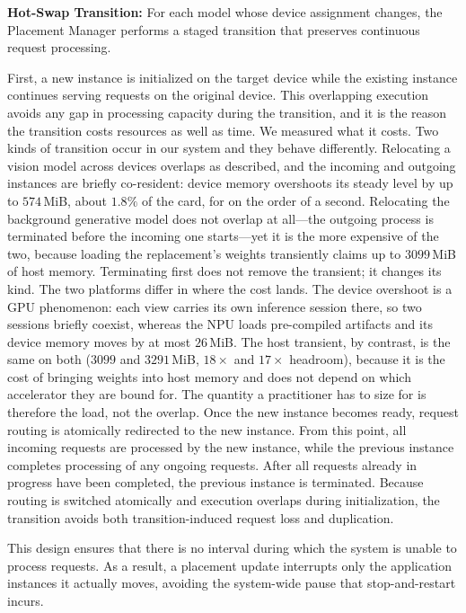 \documentclass[conference]{IEEEtran}
\begin{document}
\noindent\textbf{Hot-Swap Transition: }
For each model whose device assignment changes, the Placement Manager performs a staged transition that preserves continuous request processing.

First, a new instance is initialized on the target device while the existing instance continues serving requests on the original device. 
This overlapping execution avoids any gap in processing capacity during the transition, and it is the reason the transition costs resources as well as time.
\textcolor{navyblue}{We measured what it costs. Two kinds of transition occur in our system and they behave differently. Relocating a vision model across devices overlaps as described, and the incoming and outgoing instances are briefly co-resident: device memory overshoots its steady level by up to $574$\,MiB, about $1.8\%$ of the card, for on the order of a second. Relocating the background generative model does not overlap at all---the outgoing process is terminated before the incoming one starts---yet it is the more expensive of the two, because loading the replacement's weights transiently claims up to $3099$\,MiB of host memory. Terminating first does not remove the transient; it changes its kind. The two platforms differ in where the cost lands. The device overshoot is a GPU phenomenon: each view carries its own inference session there, so two sessions briefly coexist, whereas the NPU loads pre-compiled artifacts and its device memory moves by at most $26$\,MiB. The host transient, by contrast, is the same on both ($3099$ and $3291$\,MiB, $18\times$ and $17\times$ headroom), because it is the cost of bringing weights into host memory and does not depend on which accelerator they are bound for. The quantity a practitioner has to size for is therefore the load, not the overlap.}
%
Once the new instance becomes ready, request routing is atomically redirected to the new instance. 
From this point, all incoming requests are processed by the new instance, while the previous instance completes processing of any ongoing requests.
%
After all requests already in progress have been completed, the previous instance is terminated.
Because routing is switched atomically and execution overlaps during initialization, the transition avoids both \textcolor{navyblue}{transition-induced} request loss and duplication.

This design ensures that there is no interval during which the system is unable to process requests. 
\textcolor{navyblue}{As a result, a placement update interrupts only the application instances it actually moves, avoiding the system-wide pause that stop-and-restart incurs.}
\end{document}
